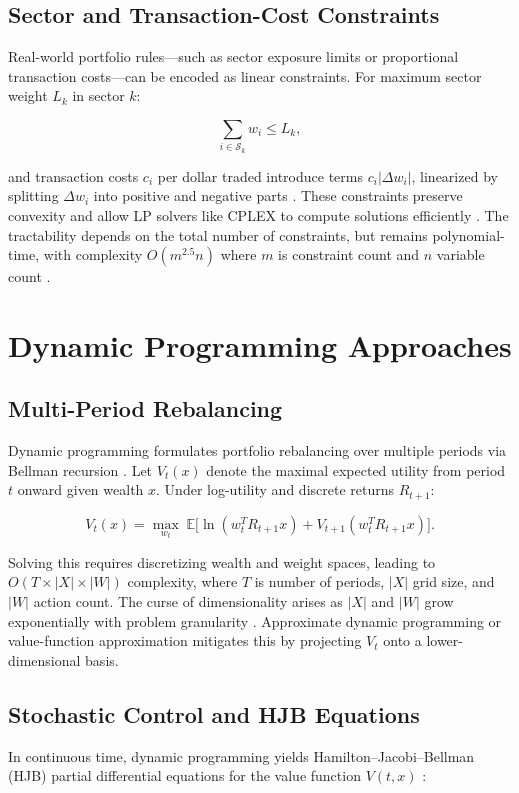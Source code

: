 \documentclass{article}
\begin{document}
\subsection{Sector and Transaction-Cost Constraints}
Real-world portfolio rules—such as sector exposure limits or proportional transaction costs—can be encoded as linear constraints. For maximum sector weight $L_k$ in sector $k$:

$$
  \sum_{i\in \mathcal S_k} w_i \le L_k,
$$

and transaction costs $c_i$ per dollar traded introduce terms $c_i|\Delta w_i|$, linearized by splitting $\Delta w_i$ into positive and negative parts \cite{fabozzi2007}. These constraints preserve convexity and allow LP solvers like CPLEX to compute solutions efficiently \cite{cplex}. The tractability depends on the total number of constraints, but remains polynomial-time, with complexity $O(m^{2.5}n)$ where $m$ is constraint count and $n$ variable count \cite{chvatal1983}.

\section{Dynamic Programming Approaches}

\subsection{Multi-Period Rebalancing}
Dynamic programming formulates portfolio rebalancing over multiple periods via Bellman recursion \cite{bellman1957}. Let $V_t(x)$ denote the maximal expected utility from period $t$ onward given wealth $x$. Under log-utility and discrete returns $R_{t+1}$:

$$
  V_t(x) = \max_{w_t}\; \mathbb{E}\bigl[\ln(w_t^T R_{t+1} x) + V_{t+1}(w_t^T R_{t+1} x)\bigr].
$$

Solving this requires discretizing wealth and weight spaces, leading to $O(T\times |X|\times |W|)$ complexity, where $T$ is number of periods, $|X|$ grid size, and $|W|$ action count. The curse of dimensionality arises as $|X|$ and $|W|$ grow exponentially with problem granularity \cite{powell2011}. Approximate dynamic programming or value-function approximation \cite{powell2011} mitigates this by projecting $V_t$ onto a lower-dimensional basis.

\subsection{Stochastic Control and HJB Equations}
In continuous time, dynamic programming yields Hamilton–Jacobi–Bellman (HJB) partial differential equations for the value function $V(t,x)$ \cite{merton1971,fleming2006}:
\end{document}
